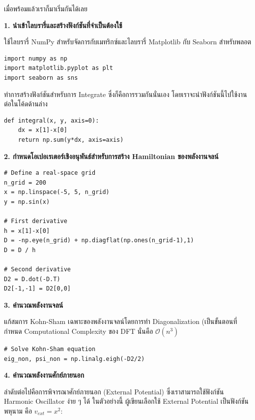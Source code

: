 \noindent เมื่อพร้อมแล้วเราก็มาเริ่มกันได้เลย

\noindent \textbf{1. นำเข้าไลบรารี่และสร้างฟังก์ชันที่จำเป็นต้องใช้}

ใช้ไลบรารี่ NumPy สำหรับจัดการกับเมทริกซ์และไลบรารี่ Matplotlib กับ Seaborn สำหรับพลอต
\begin{lstlisting}[style=MyPython]
import numpy as np
import matplotlib.pyplot as plt
import seaborn as sns
\end{lstlisting}

\vspace{1em}
ทำการสร้างฟังก์ชันสำหรับการ Integrate ซึ่งก็คือการรวมกันนั่นเอง โดยเราจะนำฟังก์ชันนี้ไปใช้งานต่อในโค้ดด้านล่าง

\begin{lstlisting}[style=MyPython]
def integral(x, y, axis=0):
    dx = x[1]-x[0]
    return np.sum(y*dx, axis=axis)
\end{lstlisting}

\vspace{1em}
\noindent \textbf{2. กำหนดโอเปอเรเตอร์เชิงอนุพันธ์สำหรับการสร้าง Hamiltonian ของพลังงานจลน์}

\begin{lstlisting}[style=MyPython]
# Define a real-space grid
n_grid = 200
x = np.linspace(-5, 5, n_grid)
y = np.sin(x)

# First derivative
h = x[1]-x[0]
D = -np.eye(n_grid) + np.diagflat(np.ones(n_grid-1),1)
D = D / h

# Second derivative
D2 = D.dot(-D.T)
D2[-1,-1] = D2[0,0]
\end{lstlisting}

\vspace{1em}
\noindent \textbf{3. คำนวณพลังงานจลน์}

แก้สมการ Kohn-Sham เฉพาะของพลังงานจลน์โดยการทำ Diagonalization (เป็นขั้นตอนที่กำหนด Computational Complexity ของ DFT
นั่นคือ $\mathcal{O}(n^{3})$

\begin{lstlisting}[style=MyPython]
# Solve Kohn-Sham equation
eig_non, psi_non = np.linalg.eigh(-D2/2)
\end{lstlisting}

\vspace{1em}
\noindent \textbf{4. คำนวณพลังงานศักย์ภายนอก}

ลำดับต่อไปคือการพิจารณาศักย์ภายนอก (External Potential) ซึ่งเราสามารถใช้ฟังก์ชัน Harmonic Oscillator ง่าย ๆ ได้ ในตัวอย่างนี้%
ผู้เขียนเลือกใช้ External Potential เป็นฟังก์ชันพหุนาม คือ $v_{ext}=x^2$:

